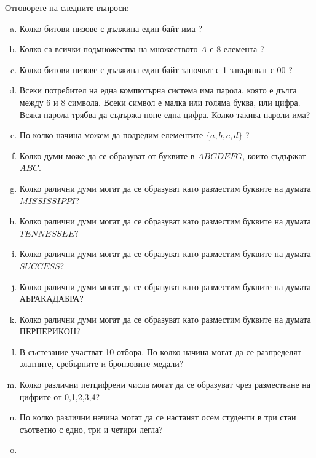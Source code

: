 \begin{problem}
  Отговорете на следните въпроси:
  \begin{enumerate}[a)]
  \item
    Колко битови низове с дължина един байт има ?
  \item
    Колко са всички подмножества на множеството $A$ с $8$ елемента ?
  \item 
    Колко битови низове с дължина един байт започват с 1 завършват с 00 ?
  \item
    Всеки потребител на една компютърна система има парола, която е дълга между 6 и 8 символа.
    Всеки символ е малка или голяма буква, или цифра.
    Всяка парола трябва да съдържа поне една цифра.
    Колко такива пароли има?
  \item
    По колко начина можем да подредим елементите $\{a,b,c,d\}$ ?
  \item 
    Колко думи може да се образуват от буквите в $ABCDEFG$, които съдържат $ABC$.
  \item
    Колко ралични думи могат да се образуват като разместим буквите на думата $MISSISSIPPI$?
  \item
    Колко ралични думи могат да се образуват като разместим буквите на думата $TENNESSEE$?
  \item
    Колко ралични думи могат да се образуват като разместим буквите на думата $SUCCESS$?
  \item
    Колко ралични думи могат да се образуват като разместим буквите на думата АБРАКАДАБРА?
  \item
    Колко ралични думи могат да се образуват като разместим буквите на думата ПЕРПЕРИКОН?
  \item
    В състезание участват 10 отбора. 
    По колко начина могат да се разпределят златните, сребърните и бронзовите медали?
  \item
    Колко различни петцифрени числа могат да се образуват чрез разместване на цифрите от 0,1,2,3,4?
  \item
    По колко различни начина могат да се настанят осем студенти в три стаи съответно с едно, три и четири легла?
  \item

\end{enumerate}
\end{problem}
